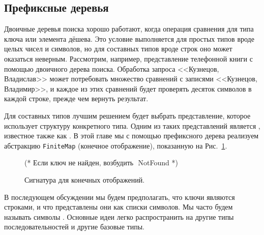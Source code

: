 \subsection{Префиксные деревья}
\label{sc:10.3.1}

Двоичные деревья поиска хорошо работают, когда операция сравнения для
типа ключа или элемента дёшева. Это условие выполняется для простых
типов вроде целых чисел и символов, но для составных типов вроде строк оно
может оказаться неверным. Рассмотрим, например, представление
телефонной книги с помощью двоичного дерева поиска. Обработка запроса
<<Кузнецов, Владислав>> может потребовать множество сравнений с
записями <<Кузнецов, Владимир>>, и каждое из этих сравнений будет
проверять десяток символов в каждой строке, прежде чем вернуть
результат.

Для составных типов лучшим решением будет выбрать представление,
которое использует структуру конкретного типа. Одним из таких
представлений является , известное также
как . В этой главе
мы с помощью префиксного дерева реализуем абстракцию
\lstinline!FiniteMap! (конечное отображение), показанную на Рис.~\ref{fig:10.9}.

\begin{figure}
  \centering
  
  (* $\mbox{Если ключ не найден, возбудить }$ NotFound *)
  \caption{Сигнатура для конечных отображений.}
  \label{fig:10.9}
\end{figure}

В последующем обсуждении мы будем предполагать, что ключи являются
строками, и что представлены они как списки символов. Мы часто будем
называть символы . Основные идеи легко
распространить на другие типы последовательностей и другие базовые
типы. 

